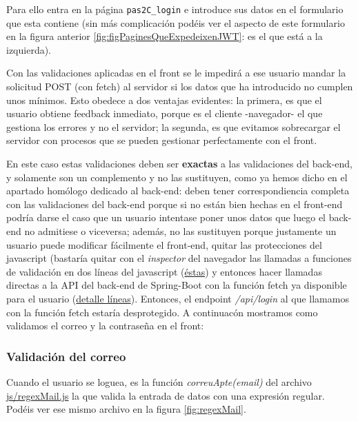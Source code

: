 \documentclass[a4paper,12pt]{report}
\begin{document}
	Para ello entra en la página \texttt{pas2C\_login} e introduce sus datos en el formulario que esta contiene (sin más complicación podéis ver el aspecto de este formulario en la figura anterior \ref{fig:figPaginesQueExpedeixenJWT}: es el que está a la izquierda).
	
	Con las validaciones aplicadas en el front se le impedirá a ese usuario mandar la solicitud POST (con fetch) al servidor si los datos que ha introducido no cumplen unos mínimos. Esto obedece a dos ventajas evidentes: la primera, es que el usuario obtiene feedback inmediato, porque es el cliente -navegador- el que gestiona los errores y no el servidor; la segunda, es que evitamos sobrecargar el servidor con procesos que se pueden gestionar perfectamente con el front.
	
	En este caso estas validaciones deben ser \textbf{exactas} a las validaciones del back-end, y solamente son un complemento y no las sustituyen, como ya hemos dicho en el apartado homólogo dedicado al back-end: deben tener correspondiencia completa con las validaciones del back-end porque si no están bien hechas en el front-end podría darse el caso que un usuario intentase poner unos datos que luego el back-end no admitiese o viceversa; además, no las sustituyen porque justamente un usuario puede modificar fácilmente el front-end, quitar las protecciones del javascript (bastaría quitar con el \textit{inspector} del navegador las llamadas a funciones de validación en dos líneas del javascript (\href{https://github.com/blackcub3s/mercApp/blob/d848aa27c1e460dc54bb665e9091d83e4b614531/APP%20WEB/__frontend__produccio__/app/pas2C_login.html#L31-L32}{éstas}) y entonces hacer llamadas directas a la API del back-end de Spring-Boot con la función fetch ya disponible para el usuario (\href{https://github.com/blackcub3s/mercApp/blob/d848aa27c1e460dc54bb665e9091d83e4b614531/APP%20WEB/__frontend__produccio__/app/pas2C_login.html#L36C31-L36C63}{detalle líneas}). Entonces, el endpoint \textit{/api/login} al que llamamos con la función fetch estaría desprotegido. A continuacón mostramos como validamos el correo y la contraseña en el front:
	
		\subsubsection{Validación del correo}
	
		Cuando el usuario se loguea, es la función \textit{correuApte(email)} del archivo \href{https://github.com/blackcub3s/mercApp/blob/d848aa27c1e460dc54bb665e9091d83e4b614531/APP%20WEB/__frontend__produccio__/app/js/regexMail.js}{js/regexMail.js} la que valida la entrada de datos con una expresión regular. Podéis ver ese mismo archivo en la figura \ref{fig:regexMail}. 
		
\end{document}
